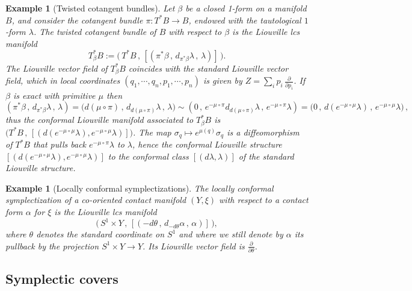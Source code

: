 \documentclass{amsart}
\newtheorem{example}[thm]{Example}
\theoremstyle{remark}
\begin{document}
\begin{example}[Twisted cotangent bundles]\label{example: twisted cotangent bundle}
Let $\beta$ be a closed 1-form on a manifold $B$,
and consider the cotangent bundle $\pi: T^{\ast}B \rightarrow B$,
endowed with the tautological $1$-form $\lambda$.
The twisted cotangent bundle of $B$ with respect to $\beta$
is the Liouville lcs manifold
$$
T^*_\beta B :=
\big( \, T^{\ast}B \,,\,
[(\pi^{\ast}\beta \,,\, d_{\pi^{\ast}\beta} \lambda \,,\, \lambda) ] \, \big).
$$
The Liouville vector field of $T^*_\beta B$
coincides with the standard Liouville vector field,
which in local coordinates $(q_1, \cdots, q_n, p_1, \cdots, p_n)$
is given by
$Z = \sum_{i} p_i \, \frac{\partial}{\partial p_i}$.
If $\beta$ is exact with primitive $\mu$ then
\[
(\pi^{\ast}\beta \,,\, d_{\pi^{\ast}\beta} \lambda \,,\, \lambda)
= \big( d (\mu \circ \pi) \,,\, d_{d(\mu \circ \pi)} \lambda \,,\, \lambda \big)
\sim (0 \,,\, e^{-\mu \circ \pi} d_{d(\mu \circ \pi)} \lambda \,,\, e^{-\mu \circ \pi} \lambda )
= \big( 0 \,,\, d( e^{-\mu \circ \mu} \lambda ) \,,\, e^{-\mu \circ \mu} \lambda \big) \,,
\]
thus the conformal Liouville manifold associated to $T^*_\beta B$
is $\big( T^{\ast}B \,,\,
[( d( e^{-\mu \circ \mu} \lambda ), e^{-\mu \circ \mu} \lambda )] \big)$.
The map $\sigma_q \mapsto e^{\mu(q)} \sigma_q$
is a diffeomorphism of $T^{\ast}B$
that pulls back $e^{-\mu \circ \pi} \lambda$ to $\lambda$,
hence the conformal Liouville structure
$[( d( e^{-\mu \circ \mu} \lambda ), e^{-\mu \circ \mu} \lambda )]$
to the conformal class $[( d\lambda , \lambda )]$
of the standard Liouville structure.
\end{example}

\begin{example}[Locally conformal symplectizations]
The locally conformal symplectization
of a co-oriented contact manifold $( Y, \xi)$
with respect to a contact form $\alpha$ for $\xi$ is the Liouville lcs manifold
\[
\big(\, S^1 \times Y \,,\, [(-d\theta \,,\, d_{-d\theta}\alpha \,,\, \alpha )] \,\big),
\]
where $\theta$ denotes the standard coordinate on $S^1$
and where we still denote by $\alpha$
its pullback by the projection $S^1 \times Y \rightarrow Y$.
Its Liouville vector field is $\frac{\partial}{\partial \theta}$.
\end{example}



\subsection{Symplectic covers}
\end{document}
